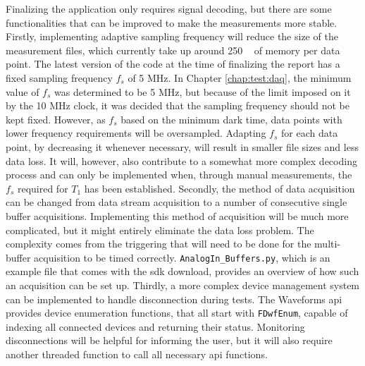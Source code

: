 Finalizing the application only requires signal decoding, but there are some functionalities that can be improved to make the measurements more stable. Firstly, implementing adaptive sampling frequency will reduce the size of the measurement files, which currently take up around 250 \unit{\mega\byte} of memory per data point. The latest version of the code at the time of finalizing the report has a fixed sampling frequency $f_s$ of 5 \unit{\mega\hertz}. In Chapter \ref{chap:test:daq}, the minimum value of $f_s$ was determined to be 5 \unit{\mega\hertz}, but because of the limit imposed on it by the 10 \unit{\mega\hertz} clock, it was decided that the sampling frequency should not be kept fixed. However, as $f_s$ based on the minimum dark time, data points with lower frequency requirements will be oversampled. Adapting $f_s$ for each data point, by decreasing it whenever necessary, will result in smaller file sizes and less data loss. It will, however, also contribute to a somewhat more complex decoding process and can only be implemented when, through manual measurements, the $f_s$ required for $T_1$ has been established. Secondly, the method of data acquisition can be changed from data stream acquisition to a number of consecutive single buffer acquisitions. Implementing this method of acquisition will be much more complicated, but it might entirely eliminate the data loss problem. The complexity comes from the triggering that will need to be done for the multi-buffer acquisition to be timed correctly. \lstinline|AnalogIn_Buffers.py|, which is an example file that comes with the \gls{sdk} download, provides an overview of how such an acquisition can be set up. Thirdly, a more complex device management system can be implemented to handle disconnection during tests. The Waveforms \gls{api} provides device enumeration functions, that all start with \lstinline|FDwfEnum|, capable of indexing all connected devices and returning their status. Monitoring disconnections will be helpful for informing the user, but it will also require another threaded function to call all necessary \gls{api} functions.

